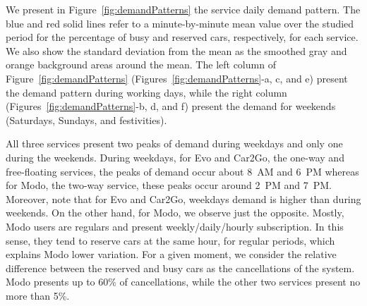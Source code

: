We present in Figure~\ref{fig:demandPatterns} the service daily demand pattern. The blue and red solid lines refer to a minute-by-minute mean value over the studied period for the percentage of busy and reserved cars, respectively, for each service. We also show the standard deviation from the mean as the smoothed gray and orange background areas around the mean. The left column of Figure~\ref{fig:demandPatterns}  (Figures~\ref{fig:demandPatterns}-a, c, and e) present the demand pattern during working days, while the right column (Figures~\ref{fig:demandPatterns}-b, d, and f) present the demand for weekends (Saturdays, Sundays, and festivities). 


All three services present two peaks of demand during weekdays and only one during the weekends. 
During weekdays, for Evo and Car2Go, the one-way and free-floating services, the peaks of demand occur about 8~AM and 6~PM whereas for Modo, the two-way service, these peaks occur around 2~PM and 7~PM.
Moreover, note that for Evo and Car2Go, weekdays demand is higher than during weekends. On the other hand, for Modo, we observe just the opposite. 
Mostly, Modo users are regulars and present weekly/daily/hourly subscription. In this sense, they tend to reserve cars at the same hour, for regular periods, which explains Modo lower variation.
For a given moment, we consider the relative difference between the reserved and busy cars as the cancellations of the system. Modo presents up to 60\% of cancellations, while the other two services present no more than 5\%. 



